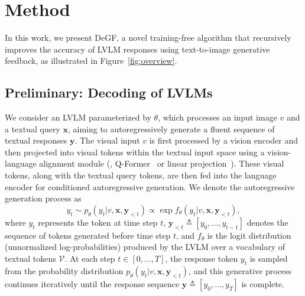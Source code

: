 \vspace{-3pt}
\section{Method}
\vspace{-2pt}
\label{sec:method}
In this work, we present DeGF, a novel training-free algorithm that recursively improves the accuracy of LVLM responses using text-to-image generative feedback, as illustrated in Figure~\ref{fig:overview}. 

\subsection{Preliminary: Decoding of LVLMs}
We consider an LVLM parameterized by $\theta$, which processes an input image $v$ and a textual query $\mathbf{x}$, aiming to autoregressively generate a fluent sequence of textual responses $\mathbf{y}$. The visual input $v$ is first processed by a vision encoder and then projected into visual tokens within the textual input space using a vision-language alignment module (\eg, Q-Former~\citep{li2023blip} or linear projection~\citep{liu2023visual}). These visual tokens, along with the textual query tokens, are then fed into the language encoder for conditioned autoregressive generation. We denote the autoregressive generation process as
\begin{equation}
y_t \sim p_{\theta}(y_t | v, \mathbf{x}, \mathbf{y}_{<t}) \propto \exp f_{\theta}(y_t | v, \mathbf{x}, \mathbf{y}_{<t}),
\end{equation}
where $y_t$ represents the token at time step $t$, $\mathbf{y}_{<t} \triangleq [y_0, \dots, y_{t-1}]$ denotes the sequence of tokens generated before time step $t$, and $f_{\theta}$ is the logit distribution (unnormalized log-probabilities) produced by the LVLM over a vocabulary of textual tokens $\mathcal{V}$. At each step $t \in [0, \dots, T]$, the response token $y_t$ is sampled from the probability distribution $p_{\theta}(y_t | v, \mathbf{x}, \mathbf{y}_{<t})$, and this generative process continues iteratively until the response sequence $\mathbf{y} \triangleq [y_0, \dots, y_{T}]$ is complete.


